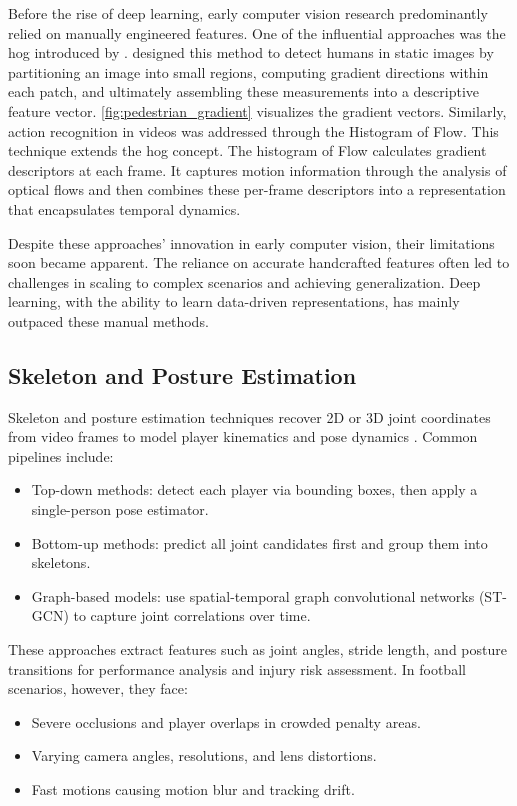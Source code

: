 Before the rise of deep learning, early computer vision research predominantly relied on manually engineered features. One of the influential approaches was the \acrfull{hog} introduced by \textcite{dalal_histogram_of_gradients}. \textcite{dalal_histogram_of_gradients} designed this method to detect humans in static images by partitioning an image into small regions, computing gradient directions within each patch, and ultimately assembling these measurements into a descriptive feature vector. \autoref{fig:pedestrian_gradient} visualizes the gradient vectors. Similarly, action recognition in videos was addressed through the Histogram of Flow\cite{dalal_histogram_of_flow}. This technique extends the \acrshort{hog} concept. The histogram of Flow calculates gradient descriptors at each frame. It captures motion information through the analysis of optical flows and then combines these per-frame descriptors into a representation that encapsulates temporal dynamics. 

Despite these approaches' innovation in early computer vision, their limitations soon became apparent. The reliance on accurate handcrafted features often led to challenges in scaling to complex scenarios and achieving generalization. Deep learning, with the ability to learn data-driven representations, has mainly outpaced these manual methods.

\subsection{Skeleton and Posture Estimation}
\label{ssec:skeleton_posture_estimation}

Skeleton and posture estimation techniques recover 2D or 3D joint coordinates from video frames to model player kinematics and pose dynamics \cite{elaoud_skeleton-based_2020, wang_skeleton_two-stream_2023, reilly__skeleton_just_pi_2023}. Common pipelines include:
\begin{itemize}
    \item Top-down methods: detect each player via bounding boxes, then apply a single-person pose estimator.
    \item Bottom-up methods: predict all joint candidates first and group them into skeletons.
    \item Graph-based models: use spatial-temporal graph convolutional networks (ST-GCN) to capture joint correlations over time\cite{yan_spatial_temporal_graph_convolutional_2018}.
\end{itemize}
These approaches extract features such as joint angles, stride length, and posture transitions for performance analysis and injury risk assessment. In football scenarios, however, they face:
\begin{itemize}
    \item Severe occlusions and player overlaps in crowded penalty areas.
    \item Varying camera angles, resolutions, and lens distortions.
    \item Fast motions causing motion blur and tracking drift\cite{survey_of_survey}.
\end{itemize} 


